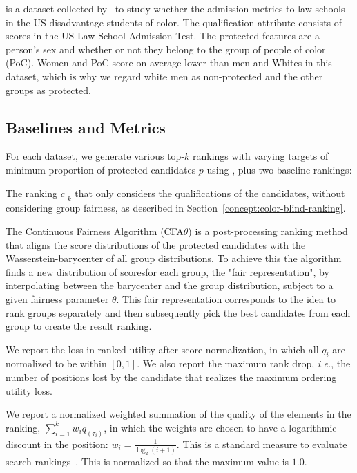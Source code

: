  is a dataset collected by~\citet{wightman1998lsac} to study whether the admission metrics to law schools in the US disadvantage students of color. 
%
The qualification attribute consists of scores in the US Law School Admission Test.
%
The protected features are a person's sex and whether or not they belong to the group of people of color (PoC).
%
Women and PoC score on average lower than men and Whites in this dataset, which is why we regard white men as non-protected and the other groups as protected.

\subsection{Baselines and Metrics}\label{sec:experiments-baselines}

For each dataset, we generate various top-$k$ rankings with varying targets of minimum proportion of protected candidates $p$ using \algoFAIR, plus two baseline rankings:

 The ranking $c|_k$ that only considers the qualifications of the candidates, without considering group fairness, as described in Section~\ref{concept:color-blind-ranking}.

 The Continuous Fairness Algorithm (CFA$\theta$) is a post-processing ranking method that aligns the score distributions of the protected candidates with the Wasserstein-barycenter of all group distributions.
%
To achieve this the algorithm finds a new distribution of scoresfor each group, the "fair representation", by interpolating between the barycenter and the group distribution, subject to a given fairness parameter $\theta$.
%
This fair representation corresponds to the idea to rank groups separately and then subsequently pick the best candidates from each group to create the result ranking. 

 We report the loss in ranked utility after score normalization, in which all $q_i$ are normalized to be within $[0, 1]$.
%
We also report the maximum rank drop, {\em i.e.}, the number of positions lost by the candidate that realizes the maximum ordering utility loss.

%
We report a normalized weighted summation of the quality of the elements in the ranking, $\sum_{i=1}^{k} w_i q_{(\tau_i)}$, in which the weights are chosen to have a logarithmic discount in the position:  $w_i = \frac{1}{\log_2 (i+1)}$. This is a standard measure to evaluate search rankings~\cite{jarvelin2002cumulated}.
%
This is normalized so that the maximum value is $1.0$.

